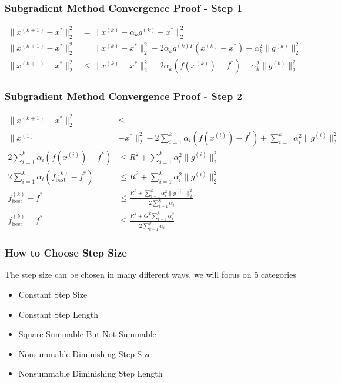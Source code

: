 \documentclass{beamer}
\DeclareMathOperator{\best}{best}
\begin{document}
\begin{frame}
\frametitle{Subgradient Method Convergence Proof - Step 1}
\begin{equation}
\begin{aligned}
\|x^{(k+1)}-x^*\|^2_2 &= \|x^{(k)} - \alpha_k g^{(k)}-x^*\|^2_2 \\
\|x^{(k+1)}-x^*\|^2_2 &= \|x^{(k)}-x^*\|^2_2 - 2\alpha_k g^{(k)T}(x^{(k)}-x^*) + \alpha^2_k \|g^{(k)}\|^2_2 \\
\|x^{(k+1)}-x^*\|^2_2 &\leq \|x^{(k)}-x^*\|^2_2 - 2\alpha_k (f(x^{(k)})-f^*) + \alpha^2_k \|g^{(k)}\|^2_2
\end{aligned}
\end{equation}
\end{frame}


\begin{frame}
\frametitle{Subgradient Method Convergence Proof - Step 2}
\begin{equation}
    \begin{aligned}
\|x^{(k+1)}-x^*\|^2_2 & \leq \\ 
    \|x^{(1)} & -x^*\|^2_2 - 2\sum^k_{i=1}\alpha_i (f(x^{(i)})-f^*) + \sum^k_{i=1}\alpha^2_i\|g^{(i)}\|^2_2 \\ 
2\sum^k_{i=1}\alpha_i (f(x^{(i)})-f^*) & \leq R^2  + \sum^k_{i=1}\alpha^2_i\|g^{(i)}\|^2_2 \\
2\sum^k_{i=1}\alpha_i (f^{(k)}_{\best}-f^*) & \leq R^2  + \sum^k_{i=1}\alpha^2_i\|g^{(i)}\|^2_2 \\
f^{(k)}_{\best}-f^* &\leq \frac{R^2  + \sum^k_{i=1}\alpha^2_i\|g^{(i)}\|^2_2}{2\sum^k_{i=1}\alpha_i} \\
f^{(k)}_{\best}-f^* &\leq \frac{R^2  + G^2 \sum^k_{i=1}\alpha^2_i}{2\sum^k_{i=1}\alpha_i}
\end{aligned}
\end{equation}
\end{frame}

\begin{frame}
\frametitle{How to Choose Step Size}
The step size can be chosen in many different ways, we will focus on 5 categories
\begin{itemize}
    \item Constant Step Size
    \item Constant Step Length
    \item Square Summable But Not Summable
    \item Nonsummable Diminishing Step Size
    \item Nonsummable Diminishing Step Length
\end{itemize}
\end{frame}
\end{document}
